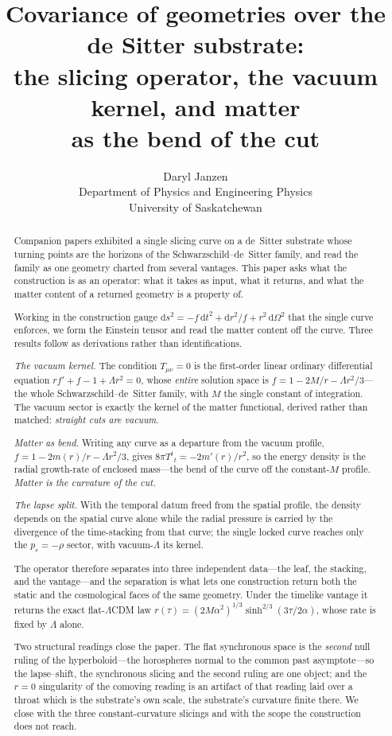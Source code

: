 \documentclass[11pt,a4paper]{article}
\title{Covariance of geometries over the de Sitter substrate:\\
\large the slicing operator, the vacuum kernel, and matter\\
as the bend of the cut}
\author{Daryl Janzen\\
\small Department of Physics and Engineering Physics\\
\small University of Saskatchewan}
\date{}
\theoremstyle{definition}
\newcommand{\dd}{\mathrm{d}}
\begin{document}
\maketitle

\begin{abstract}
Companion papers exhibited a single slicing curve on a de~Sitter substrate whose turning points are the horizons of the Schwarzschild--de~Sitter family, and read the family as one geometry charted from several vantages. This paper asks what the construction is as an operator: what it takes as input, what it returns, and what the matter content of a returned geometry is a property of.

Working in the construction gauge $\dd s^2=-f\,\dd t^2+\dd r^2/f+r^2\,\dd\Omega^2$ that the single curve enforces, we form the Einstein tensor and read the matter content off the curve. Three results follow as derivations rather than identifications.

\emph{The vacuum kernel.} The condition $T_{\mu\nu}=0$ is the first-order linear ordinary differential equation $rf'+f-1+\Lambda r^{2}=0$, whose \emph{entire} solution space is $f=1-2M/r-\Lambda r^{2}/3$---the whole Schwarzschild--de~Sitter family, with $M$ the single constant of integration. The vacuum sector is exactly the kernel of the matter functional, derived rather than matched: \emph{straight cuts are vacuum}.

\emph{Matter as bend.} Writing any curve as a departure from the vacuum profile, $f=1-2m(r)/r-\Lambda r^{2}/3$, gives $8\pi T^{t}{}_{t}=-2m'(r)/r^{2}$, so the energy density is the radial growth-rate of enclosed mass---the bend of the curve off the constant-$M$ profile. \emph{Matter is the curvature of the cut.}

\emph{The lapse split.} With the temporal datum freed from the spatial profile, the density depends on the spatial curve alone while the radial pressure is carried by the divergence of the time-stacking from that curve; the single locked curve reaches only the $p_{r}=-\rho$ sector, with vacuum-$\Lambda$ its kernel.

The operator therefore separates into three independent data---the leaf, the stacking, and the vantage---and the separation is what lets one construction return both the static and the cosmological faces of the same geometry. Under the timelike vantage it returns the exact flat-$\Lambda$CDM law $r(\tau)=(2M\alpha^{2})^{1/3}\sinh^{2/3}(3\tau/2\alpha)$, whose rate is fixed by $\Lambda$ alone.

Two structural readings close the paper. The flat synchronous space is the \emph{second} null ruling of the hyperboloid---the horospheres normal to the common past asymptote---so the lapse--shift, the synchronous slicing and the second ruling are one object; and the $r=0$ singularity of the comoving reading is an artifact of that reading laid over a throat which is the substrate's own scale, the substrate's curvature finite there. We close with the three constant-curvature slicings and with the scope the construction does not reach.
\end{abstract}
\end{document}

